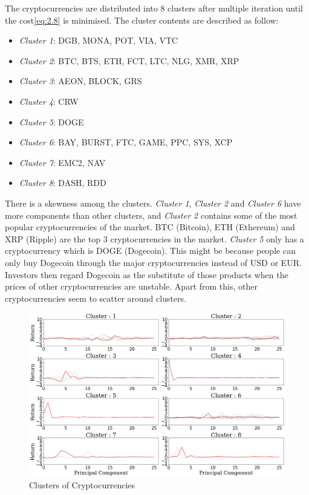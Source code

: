 \documentclass[11pt]{article} %
\theoremstyle{plain}
\theoremstyle{definition}
\begin{document}
The cryptocurrencies are distributed into 8 clusters after multiple iteration until the cost\eqref{eq:2.8} is minimised. The cluster contents are described as follow:
\begin{itemize}
    \item \textsl{Cluster 1}: DGB, MONA, POT, VIA, VTC
    \item \textsl{Cluster 2}: BTC, BTS, ETH, FCT, LTC, NLG, XMR, XRP
    \item \textsl{Cluster 3}: AEON, BLOCK, GRS
    \item \textsl{Cluster 4}: CRW
    \item \textsl{Cluster 5}: DOGE
    \item \textsl{Cluster 6}: BAY, BURST, FTC, GAME, PPC, SYS, XCP
    \item \textsl{Cluster 7}: EMC2, NAV
    \item \textsl{Cluster 8}: DASH, RDD
\end{itemize}

There is a skewness among the clusters. \textsl{Cluster 1}, \textsl{Cluster 2} and \textsl{Cluster 6} have more components than other clusters, and \textsl{Cluster 2} contains some of the most popular cryptocurrencies of the market. BTC (Bitcoin), ETH (Ethereum) and XRP (Ripple) are the top 3 cryptocurrencies in the market. \textsl{Cluster 5} only has a cryptocurrency which is DOGE (Dogecoin). This might be because people can only buy Dogecoin through the major cryptocurrencies instead of USD or EUR. Investors then regard Dogecoin as the substitute of those products when the prices of other cryptocurrencies are unstable. Apart from this, other cryptocurrencies seem to scatter around clusters.

\begin{figure}[ht]
    \includegraphics[width=1\linewidth, center]{resources/crypto_kmeans.png}
    \caption{Clusters of Cryptocurrencies}
    \label{fig:cryptokmeans}
\end{figure}
\end{document}
